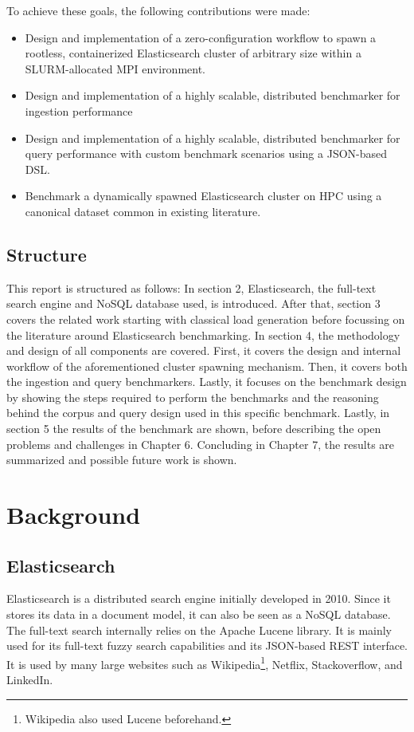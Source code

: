 To achieve these goals, the following contributions were made:

\begin{itemize}
\item Design and implementation of a zero-configuration workflow to spawn a rootless, containerized Elasticsearch cluster of arbitrary size within a SLURM-allocated \ac{MPI} environment.
\item Design and implementation of a highly scalable, distributed benchmarker for ingestion performance
\item Design and implementation of a highly scalable, distributed benchmarker for query performance with custom benchmark scenarios using a \ac{JSON}-based \ac{DSL}.
\item Benchmark a dynamically spawned Elasticsearch cluster on \ac{HPC} using a canonical dataset common in existing literature.
\end{itemize}
\subsection{Structure}
This report is structured as follows: In section 2, Elasticsearch, the full-text search engine and NoSQL database used, is introduced. After that, section 3 covers the related work starting with classical load generation before focussing on the literature around Elasticsearch benchmarking. In section 4, the methodology and design of all components are covered. First, it covers the design and internal workflow of the aforementioned cluster spawning mechanism. Then, it covers both the ingestion and query benchmarkers. Lastly, it focuses on the benchmark design by showing the steps required to perform the benchmarks and the reasoning behind the corpus and query design used in this specific benchmark. Lastly, in section 5 the results of the benchmark are shown, before describing the open problems and challenges in Chapter 6. Concluding in Chapter 7, the results are summarized and possible future work is shown.

\section{Background}
\subsection{Elasticsearch}
Elasticsearch is a distributed search engine initially developed in 2010. Since it stores its data in a document model, it can also be seen as a NoSQL database. The full-text search internally relies on the Apache Lucene library. It is mainly used for its full-text fuzzy search capabilities and its \ac{JSON}-based REST interface. It is used by many large websites such as Wikipedia\footnote{Wikipedia also used Lucene beforehand.}, Netflix, Stackoverflow, and LinkedIn.

